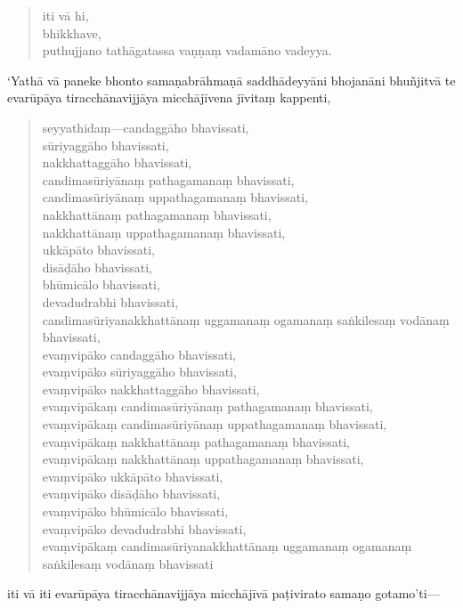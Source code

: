 \documentclass[11pt,twoside,openright]{book}
\begin{document}
\begin{verse}
iti vā hi,\\
\vin  bhikkhave,\\
\vin  puthujjano tathāgatassa vaṇṇaṃ vadamāno vadeyya.

\end{verse}
\pstart
‘Yathā vā paneke bhonto samaṇabrāhmaṇā saddhādeyyāni bhojanāni bhuñjitvā te evarūpāya tiracchānavijjāya micchājīvena jīvitaṃ kappenti,
\pend

\begin{verse}
seyyathidaṃ—candaggāho bhavissati,\\
\vin  sūriyaggāho bhavissati,\\
\vin  nakkhattaggāho bhavissati,\\
\vin  candimasūriyānaṃ pathagamanaṃ bhavissati,\\
\vin  candimasūriyānaṃ uppathagamanaṃ bhavissati,\\
\vin  nakkhattānaṃ pathagamanaṃ bhavissati,\\
\vin  nakkhattānaṃ uppathagamanaṃ bhavissati,\\
\vin  ukkāpāto bhavissati,\\
\vin  disāḍāho bhavissati,\\
\vin  bhūmicālo bhavissati,\\
\vin  devadudrabhi bhavissati,\\
\vin  candimasūriyanakkhattānaṃ uggamanaṃ ogamanaṃ saṅkilesaṃ vodānaṃ bhavissati,\\
\vin  evaṃvipāko candaggāho bhavissati,\\
\vin  evaṃvipāko sūriyaggāho bhavissati,\\
\vin  evaṃvipāko nakkhattaggāho bhavissati,\\
\vin  evaṃvipākaṃ candimasūriyānaṃ pathagamanaṃ bhavissati,\\
\vin  evaṃvipākaṃ candimasūriyānaṃ uppathagamanaṃ bhavissati,\\
\vin  evaṃvipākaṃ nakkhattānaṃ pathagamanaṃ bhavissati,\\
\vin  evaṃvipākaṃ nakkhattānaṃ uppathagamanaṃ bhavissati,\\
\vin  evaṃvipāko ukkāpāto bhavissati,\\
\vin  evaṃvipāko disāḍāho bhavissati,\\
\vin  evaṃvipāko bhūmicālo bhavissati,\\
\vin  evaṃvipāko devadudrabhi bhavissati,\\
\vin  evaṃvipākaṃ candimasūriyanakkhattānaṃ uggamanaṃ ogamanaṃ saṅkilesaṃ vodānaṃ bhavissati

\end{verse}
\pstart
iti vā iti evarūpāya tiracchānavijjāya micchājīvā paṭivirato samaṇo gotamo’ti—
\pend
\end{document}

